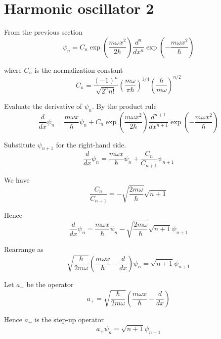 

\section*{Harmonic oscillator 2}

From the previous section
\begin{equation*}
\psi_n=C_n
\exp\left(\frac{m\omega x^2}{2\hbar}\right)
\frac{d^n}{dx^n}\exp\left(-\frac{m\omega x^2}{\hbar}\right)
\end{equation*}

where $C_n$ is the normalization constant
\begin{equation*}
C_n=\frac{(-1)^n}{\sqrt{2^nn!}}
\left(\frac{m\omega}{\pi\hbar}\right)^{1/4}
\left(\frac{\hbar}{m\omega}\right)^{n/2}
\end{equation*}

Evaluate the derivative of $\psi_n$. By the product rule
\begin{equation*}
\frac{d}{dx}\psi_n
=\frac{m\omega x}{\hbar}\psi_n
+C_n
\exp\left(\frac{m\omega x^2}{2\hbar}\right)
\frac{d^{n+1}}{dx^{n+1}}\exp\left(-\frac{m\omega x^2}{\hbar}\right)
\end{equation*}

Substitute $\psi_{n+1}$ for the right-hand side.
\begin{equation*}
\frac{d}{dx}\psi_n
=\frac{m\omega x}{\hbar}\psi_n
+\frac{C_n}{C_{n+1}}\psi_{n+1}
\end{equation*}

We have
\begin{equation*}
\frac{C_n}{C_{n+1}}
=-\sqrt{\frac{2m\omega}{\hbar}}\sqrt{n+1}
\end{equation*}

Hence
\begin{equation*}
\frac{d}{dx}\psi_n
=\frac{m\omega x}{\hbar}\psi_n
-\sqrt{\frac{2m\omega}{\hbar}}\sqrt{n+1}\psi_{n+1}
\end{equation*}

Rearrange as
\begin{equation*}
\sqrt{\frac{\hbar}{2m\omega}}
\left(\frac{m\omega x}{\hbar}-\frac{d}{dx}\right)\psi_n
=\sqrt{n+1}\psi_{n+1}
\end{equation*}

Let $a_+$ be the operator
\begin{equation*}
a_+=\sqrt{\frac{\hbar}{2m\omega}}
\left(\frac{m\omega x}{\hbar}-\frac{d}{dx}\right)
\end{equation*}

Hence $a_+$ is the step-up operator
\begin{equation*}
a_+\psi_n=\sqrt{n+1}\psi_{n+1}
\end{equation*}

